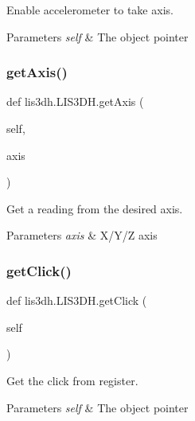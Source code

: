 Enable accelerometer to take axis. 


\begin{DoxyParams}{Parameters}
{\em self} & The object pointer \\
\hline
\end{DoxyParams}
\mbox{\label{classlis3dh_1_1_l_i_s3_d_h_a951a886538397f6cea8daf47fd362582}} 
\subsubsection{\texorpdfstring{get\+Axis()}{getAxis()}}
{\footnotesize\ttfamily def lis3dh.\+L\+I\+S3\+D\+H.\+get\+Axis (\begin{DoxyParamCaption}\item[{}]{self,  }\item[{}]{axis }\end{DoxyParamCaption})}



Get a reading from the desired axis. 


\begin{DoxyParams}{Parameters}
{\em axis} & X/\+Y/Z axis \\
\hline
\end{DoxyParams}
\mbox{\label{classlis3dh_1_1_l_i_s3_d_h_ae43358edd3cd47f8d6df25f01b8a3cf2}} 
\subsubsection{\texorpdfstring{get\+Click()}{getClick()}}
{\footnotesize\ttfamily def lis3dh.\+L\+I\+S3\+D\+H.\+get\+Click (\begin{DoxyParamCaption}\item[{}]{self }\end{DoxyParamCaption})}



Get the click from register. 


\begin{DoxyParams}{Parameters}
{\em self} & The object pointer \\
\hline
\end{DoxyParams}
\mbox{\label{classlis3dh_1_1_l_i_s3_d_h_a0e821b644781dbd2d75cbbe276a4c9cf}} 
